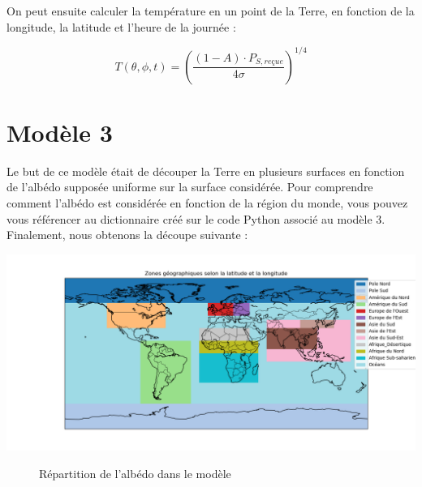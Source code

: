 \documentclass[a4paper,11pt]{article}
\begin{document}
On peut ensuite calculer la température en un point de la Terre, en fonction de la longitude, la latitude et l'heure de la journée :

\[ T (\theta , \phi , t) = \left(\dfrac{(1 - A) \cdot P_{S,reçue}}{4\sigma}\right)^{1/4} \]

\section{Modèle 3}

Le but de ce modèle était de découper la Terre en plusieurs surfaces en fonction de l'albédo supposée uniforme sur la surface considérée. Pour comprendre comment l'albédo est considérée en fonction de la région du monde, vous pouvez vous référencer au dictionnaire créé sur le code Python associé au modèle 3. Finalement, nous obtenons la découpe suivante :

\begin{adjustbox}{center}
\includegraphics[scale=0.5]{Schema_albedo}
\end{adjustbox}
\begin{figure}[h]
  \centering
  \caption{Répartition de l'albédo dans le modèle}
\end{figure}
\end{document}

